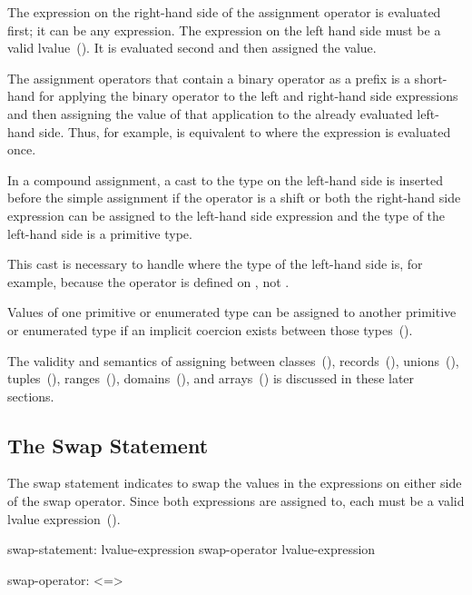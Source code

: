 The expression on the right-hand side of the assignment operator is
evaluated first; it can be any expression.  The expression on the left
hand side must be a valid lvalue~().  It is evaluated
second and then assigned the value.

The assignment operators that contain a binary operator as a prefix is
a short-hand for applying the binary operator to the left and
right-hand side expressions and then assigning the value of that
application to the already evaluated left-hand side.  Thus, for
example,  is equivalent to  where the
expression  is evaluated once.

In a compound assignment, a cast to the type on the left-hand side is
inserted before the simple assignment if the operator is a shift or
both the right-hand side expression can be assigned to the left-hand
side expression and the type of the left-hand side is a primitive
type.

\begin{rationale}
This cast is necessary to handle \chpl{+=} where the type of the
left-hand side is, for example,  because the \chpl{+}
operator is defined on , not .
\end{rationale}

Values of one primitive or enumerated type can be assigned to another
primitive or enumerated type if an implicit coercion exists between
those types~().

The validity and semantics of assigning between
classes~(), records~(),
unions~(), tuples~(),
ranges~(),
domains~(), and arrays~()
is discussed in these later sections.

\subsection{The Swap Statement}
\label{The_Swap_Statement}
The swap statement indicates to swap the values in the expressions
on either side of the swap operator.  Since both expressions are assigned
to, each must be a valid lvalue expression~().
\begin{syntax}
swap-statement:
  lvalue-expression swap-operator lvalue-expression

swap-operator:
  <=>
\end{syntax}


